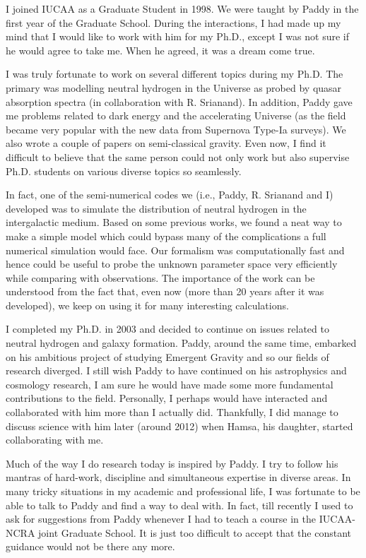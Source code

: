 \documentclass[prd, preprint, longbibliography, 11pt]{revtex4-1}
\begin{document}
I joined IUCAA as a Graduate Student in 1998. We were taught by Paddy in the first year of the Graduate School. During the interactions, I had made up my mind that I would like to work with him for my Ph.D., except I was not sure if he would agree to take me. When he agreed, it was a dream come true.

I was truly fortunate to work on several different topics during my Ph.D. The primary was modelling neutral hydrogen in the Universe as probed by quasar absorption spectra (in collaboration with R. Srianand). In addition, Paddy gave me problems related to dark energy and the accelerating Universe (as the field became very popular with the new data from Supernova Type-Ia surveys). We also wrote a couple of papers on semi-classical gravity. Even now, I find it difficult to believe that the same person could not only work but also supervise Ph.D. students on various diverse topics so seamlessly.

In fact, one of the semi-numerical codes we (i.e., Paddy, R. Srianand and I) developed was to simulate the distribution of neutral hydrogen in the intergalactic medium. Based on some previous works, we found a neat way to make a simple model which could bypass many of the complications a full numerical simulation would face. Our formalism was computationally fast and hence could be useful to probe the unknown parameter space very efficiently while comparing with observations. The importance of the work can be understood from the fact that, even now (more than 20 years after it was developed), we keep on using it for many interesting calculations.

I completed my Ph.D. in 2003 and decided to continue on issues related to neutral hydrogen and galaxy formation. Paddy, around the same time, embarked on his ambitious project of studying Emergent Gravity and so our fields of research diverged. I still wish Paddy to have continued on his astrophysics and cosmology research, I am sure he would have made some more fundamental contributions to the field. Personally, I perhaps would have interacted and collaborated with him more than I actually did. Thankfully, I did manage to discuss science with him later (around 2012) when Hamsa, his daughter, started collaborating with me.

Much of the way I do research today is inspired by Paddy. I try to follow his mantras of hard-work, discipline and simultaneous expertise in diverse areas. In many tricky situations in my academic and professional life, I was fortunate to be able to talk to Paddy and find a way to deal with. In fact, till recently I used to ask for suggestions from Paddy whenever I had to teach a course in the IUCAA-NCRA joint Graduate School. It is just too difficult to accept that the constant guidance would not be there any more.
\end{document}

